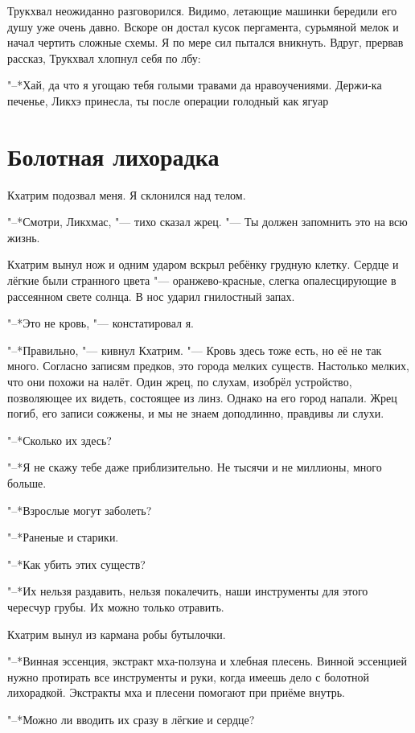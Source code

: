 \documentclass[a4paper,10pt,fleqn]{book}
\newcommand{\ldotst}{\so{...}\xspace}
\begin{document}
Трукхвал неожиданно разговорился.
Видимо, летающие машинки бередили его душу уже очень давно.
Вскоре он достал кусок пергамента, сурьмяной мелок и начал чертить сложные схемы.
Я по мере сил пытался вникнуть.
Вдруг, прервав рассказ, Трукхвал хлопнул себя по лбу:

"--*Хай, да что я угощаю тебя голыми травами да нравоучениями.
Держи-ка печенье, Ликхэ принесла, ты после операции голодный как ягуар\ldotst

\section{Болотная лихорадка}

Кхатрим подозвал меня.
Я склонился над телом.

"--*Смотри, Ликхмас, "--- тихо сказал жрец.
"--- Ты должен запомнить это на всю жизнь.

Кхатрим вынул нож и одним ударом вскрыл ребёнку грудную клетку.
Сердце и лёгкие были странного цвета "--- оранжево-красные, слегка опалесцирующие в рассеянном свете солнца.
В нос ударил гнилостный запах.

"--*Это не кровь, "--- констатировал я.

"--*Правильно, "--- кивнул Кхатрим.
"--- Кровь здесь тоже есть, но её не так много.
Согласно записям предков, это города мелких существ.
Настолько мелких, что они похожи на налёт.
Один жрец, по слухам, изобрёл устройство, позволяющее их видеть, состоящее из линз.
Однако на его город напали.
Жрец погиб, его записи сожжены, и мы не знаем доподлинно, правдивы ли слухи.

"--*Сколько их здесь?

"--*Я не скажу тебе даже приблизительно.
Не тысячи и не миллионы, много больше.

"--*Взрослые могут заболеть?

"--*Раненые и старики.

"--*Как убить этих существ?

"--*Их нельзя раздавить, нельзя покалечить, наши инструменты для этого чересчур грубы.
Их можно только отравить.

Кхатрим вынул из кармана робы бутылочки.

"--*Винная эссенция, экстракт мха-ползуна и хлебная плесень.
Винной эссенцией нужно протирать все инструменты и руки, когда имеешь дело с болотной лихорадкой.
Экстракты мха и плесени помогают при приёме внутрь.

"--*Можно ли вводить их сразу в лёгкие и сердце?
\end{document}
